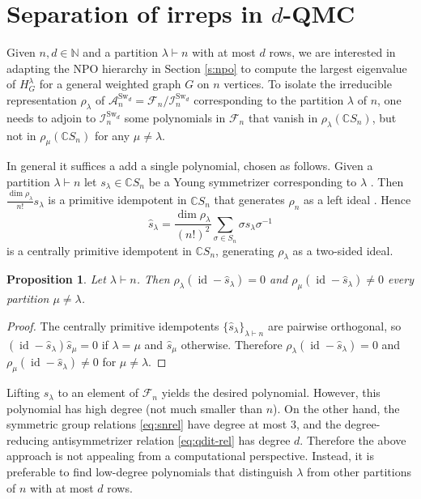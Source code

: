 \documentclass[12pt,dvipsnames,accepted=2016-08-18,a4paper,onecolumn]{quantumarticle}
\DeclareMathOperator{\id}{id}
\numberwithin{equation}{section}
\newcommand{\NN}{\mathbb N}
\newcommand{\CC}{\mathbb C}
\newcommand{\cA}{\mathcal A}
\newcommand{\cF}{\mathcal F}
\newtheorem{proposition}[theorem]{Proposition}
\theoremstyle{definition}
\begin{document}
\section{Separation of irreps in $d$-QMC}\label{sec:sep}

Given $n,d\in\NN$ and a partition $\lambda\vdash n$ with at most $d$ rows, we are interested in adapting the NPO hierarchy in Section \ref{s:npo} to compute the largest eigenvalue of $H_G^\lambda$ for a general weighted graph $G$ on $n$ vertices.
To isolate the irreducible representation $\rho_\lambda$ of $\cA^{\text{Sw}_d}_n=\cF_n / \mathcal{I}^{\text{Sw}_d}_n$ corresponding to the partition $\lambda$ of $n$, one needs to adjoin to $\mathcal{I}^{\text{Sw}_d}_n$ some polynomials in $\cF_n$ that vanish in $\rho_\lambda(\CC S_n)$, but not in $\rho_\mu(\CC S_n)$ for any $\mu\neq\lambda$. 

In general it suffices a add a single polynomial, chosen as follows.
Given a partition $\lambda\vdash n$ let $s_\lambda\in \CC S_n$ be a Young symmetrizer corresponding to $\lambda$ \cite[Section 9.2.2]{Probook}. Then $\frac{\dim\rho_\lambda}{n!}s_\lambda$ is a primitive idempotent in $\CC S_n$ that generates $\rho_n$ as a left ideal \cite[Theorems 9.2.4.1 and 9.2.4.2]{Probook}. Hence
$$\hat{s}_\lambda=\frac{\dim\rho_\lambda}{(n!)^2}\sum_{\sigma\in S_n} \sigma s_\lambda \sigma^{-1}$$
is a centrally primitive idempotent in $\CC S_n$, generating $\rho_\lambda$ as a two-sided ideal.

\begin{proposition}\label{prop:isolate_irrep}
Let $\lambda\vdash n$.
Then $\rho_\lambda(\id-\hat{s}_\lambda)=0$ and $\rho_\mu(\id-\hat{s}_\lambda)\neq0$ every partition $\mu\neq\lambda$.
\end{proposition}

\begin{proof}
The centrally primitive idempotents $\{\hat{s}_\lambda\}_{\lambda\vdash n}$ are pairwise orthogonal, so $(\id-\hat{s}_\lambda)\hat{s}_\mu=0$ if $\lambda=\mu$ and $\hat{s}_\mu$ otherwise.
Therefore $\rho_\lambda (\id-\hat{s}_\lambda)=0$ and $\rho_\mu(\id-\hat{s}_\lambda)\neq0$ for $\mu\neq\lambda$.
\end{proof}

Lifting $\hat{s}_\lambda$ to an element of $\cF_n$ yields the desired polynomial. However, this polynomial has high degree (not much smaller than $n$). On the other hand, the symmetric group relations \eqref{eq:snrel} have degree at most $3$, and the degree-reducing antisymmetrizer relation \eqref{eq:qdit-rel} has degree $d$. Therefore the above approach is not appealing from a computational perspective.
Instead, it is preferable to find low-degree polynomials that distinguish $\lambda$ from other partitions of $n$ with at most $d$ rows.
\end{document}
